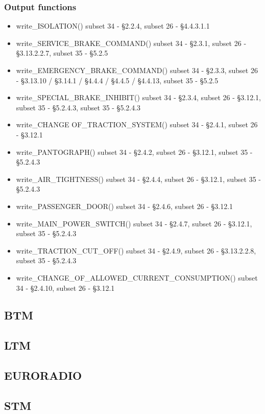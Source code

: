 \documentclass{template/openetcs_article}
\begin{document}
	\subsubsection{Output functions}
		\begin{itemize}
			\item write\_ISOLATION()
				\subitem subset 34 - §2.2.4, subset 26 - §4.4.3.1.1
			\item write\_SERVICE\_BRAKE\_COMMAND()
				\subitem subset 34 - §2.3.1, subset 26 - §3.13.2.2.7, subset 35 - §5.2.5
			\item write\_EMERGENCY\_BRAKE\_COMMAND()
				\subitem subset 34 - §2.3.3, subset 26 - §3.13.10 / §3.14.1 / §4.4.4 / §4.4.5 / §4.4.13, subset 35 - §5.2.5
			\item write\_SPECIAL\_BRAKE\_INHIBIT()
				\subitem subset 34 - §2.3.4, subset 26 - §3.12.1, subset 35 - §5.2.4.3, subset 35 - §5.2.4.3
			\item write\_CHANGE OF\_TRACTION\_SYSTEM()
				\subitem subset 34 - §2.4.1, subset 26 - §3.12.1
			\item write\_PANTOGRAPH()
				\subitem subset 34 - §2.4.2, subset 26 - §3.12.1, subset 35 - §5.2.4.3
			\item write\_AIR\_TIGHTNESS()
				\subitem subset 34 - §2.4.4, subset 26 - §3.12.1, subset 35 - §5.2.4.3
			\item write\_PASSENGER\_DOOR()
				\subitem subset 34 - §2.4.6, subset 26 - §3.12.1
			\item write\_MAIN\_POWER\_SWITCH()
				\subitem subset 34 - §2.4.7, subset 26 - §3.12.1, subset 35 - §5.2.4.3
			\item write\_TRACTION\_CUT\_OFF()
				\subitem subset 34 - §2.4.9, subset 26 - §3.13.2.2.8, subset 35 - §5.2.4.3
			\item write\_CHANGE\_OF\_ALLOWED\_CURRENT\_CONSUMPTION()
				\subitem subset 34 - §2.4.10, subset 26 - §3.12.1		
		\end{itemize}
	\subsection{BTM}
	\subsection{LTM}
	\subsection{EURORADIO}
	\subsection{STM}
\end{document}
